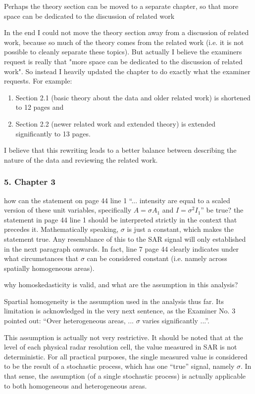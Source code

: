\replyToComment
    {Perhaps the theory section can be moved to a separate chapter, so that more space can be dedicated to the discussion of related work}
    { In the end I could not move the theory section away from a discussion of related work, because so much of the theory comes from the related work (i.e. it is not possible to cleanly separate these topics). 
    But actually I believe the examiners request is really that "more space can be dedicated to the discussion of related work". So instead I heavily updated the chapter to do exactly what the examiner requests. For example: 
\vspace{-3mm}
\begin{enumerate}
  \item Section 2.1 (basic theory about the data and older related work) is shortened to 12 pages and 
  \item Section 2.2 (newer related work and extended theory) is extended significantly to 13 pages. 
\end{enumerate}
I believe that this rewriting leads to a better balance between describing the nature of the data and reviewing the related work.
}

\subsubsection*{5. Chapter 3}

\replyToComment
    {how can the statement on page 44 line 1 ``... intensity are equal to a scaled version of these unit variables, specifically $A=\sigma A_1$ and $I=\sigma^2 I_1$'' be true?}
    {the statement in page 44 line 1 should be interpreted strictly in the context that precedes it. 
Mathematically speaking, $\sigma$ is just a constant, which makes the statement true.
Any resemblance of this to the SAR signal will only established in the next paragraph onwards.
In fact, line 7 page 44 clearly indicates under what circumstances that $\sigma$ can be considered constant (i.e. namely across spatially homogeneous areas).
}

\replyToComment
    {why homoskedasticity is valid, and what are the assumption in this analysis?}
    {Spartial homogeneity is the assumption used in the analysis thus far. 
Its limitation is acknowledged in the very next sentence, as the Examiner No. 3 pointed out: ``Over heterogeneous areas, ... $\sigma$ varies significantly ...''.

This assumption is actually not very restrictive.
It should be noted that at the level of each physical radar resolution cell, the value measured in SAR is not deterministic.
For all practical purposes, the single measured value is considered to be the result of a stochastic process, which has one ``true'' signal, namely $\sigma$.
In that sense, the assumption (of a single stochastic process) is actually applicable to both homogeneous and heterogeneous areas. 
}

